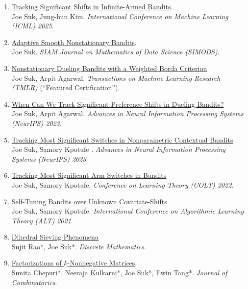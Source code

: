 \documentclass[10pt,a4paper]{moderncv}        %
\begin{document}
\begin{minipage}{\maincolumnwidth}%
	\small{
    	\begin{enumerate}
		\item \href{https://arxiv.org/pdf/2502.00108}{\color{ao} Tracking Significant Shifts in Infinite-Armed Bandits}. \\
		Joe Suk, Jung-hun Kim. {\em International Conference on Machine Learning (ICML) 2025}.
		\item \href{https://arxiv.org/pdf/2407.08654}{\color{ao} Adaptive Smooth Nonstationary Bandits}. \\
		Joe Suk. {\em SIAM Journal on Mathematics of Data Science (SIMODS)}.
	\item \href{https://arxiv.org/pdf/2403.12950}{\color{ao} Nonstationary Dueling Bandits with a Weighted Borda Criterion}\\
	 Joe Suk, Arpit Agarwal. {\em Transactions on Machine Learning Research (TMLR)} (``Featured Certification'').
	\item \href{https://arxiv.org/pdf/2302.06595.pdf}{\color{ao} When Can We Track Significant Preference Shifts in Dueling Bandits?}\\
		Joe Suk, Arpit Agarwal. {\em Advances in Neural Information Processing Systems (NeurIPS) 2023}. %
	\item \href{https://arxiv.org/pdf/2307.05341.pdf}{\color{ao} Tracking Most Significant Switches in Nonparametric Contextual Bandits}\\
		Joe Suk, Samory Kpotufe . {\em Advances in Neural Information Processing Systems (NeurIPS) 2023}.

	\item \href{https://arxiv.org/abs/2112.13838}{\color{ao} Tracking Most Significant Arm Switches in Bandits}\\
		Joe Suk, Samory Kpotufe. {\em Conference on Learning Theory (COLT) 2022}.
		\item \href{https://arxiv.org/abs/2007.08584} {\color{ao} Self-Tuning Bandits over Unknown Covariate-Shifts}\\
		Joe Suk, Samory Kpotufe. {\em International Conference on Algorithmic Learning Theory (ALT) 2021}.
          \item \href{https://arxiv.org/abs/1710.06517}{\color{ao} Dihedral Sieving Phenomena}\\
		Sujit Rao*, Joe Suk*. {\em Discrete Mathematics}.
          \item \href{https://arxiv.org/abs/1710.10867}{\color{ao} Factorizations of $k$-Nonnegative Matrices}.\\
		Sunita Chepuri*, Neeraja Kulkarni*, Joe Suk*, Ewin Tang*. {\em Journal of Combinatorics}.
		\end{enumerate}}%
\end{minipage}%
\end{document}
